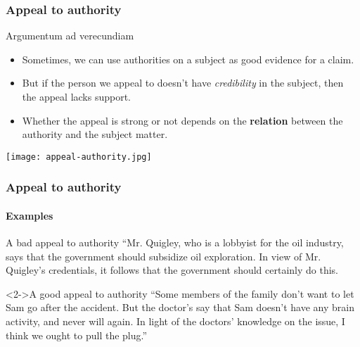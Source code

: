 \documentclass[10pt,letterpaper,xcolor=dvipsnames,handout]{beamer}
\begin{document}
\begin{frame}
  \frametitle{Appeal to authority}
  
  \begin{block}{Argumentum ad verecundiam}
    \begin{itemize}
      \item Sometimes, we can use authorities on a subject as good evidence for a claim.
      \item But if the person we appeal to doesn't have \textit{credibility} in the subject, then the appeal lacks support.
      \item Whether the appeal is strong or not depends on the \textbf{relation} between the authority and the subject matter.
    \end{itemize}
  \end{block}
  
  \begin{center}
    \texttt{[image: appeal-authority.jpg]}
  \end{center}
  
\end{frame}

\begin{frame}
  \frametitle{Appeal to authority}
  \framesubtitle{Examples}
  
  \begin{block}{A bad appeal to authority}
    ``Mr. Quigley, who is a lobbyist for the oil industry, says that the government should subsidize oil exploration.  In view of Mr. Quigley's credentials, it follows that the government should certainly do this.
  \end{block}

  \begin{block}<2->{A good appeal to authority}
    ``Some members of the family don't want to let Sam go after the accident.  But the doctor's say that Sam doesn't have any brain activity, and never will again.  In light of the doctors' knowledge on the issue, I think we ought to pull the plug.''
  \end{block}

\end{frame}
\end{document}
